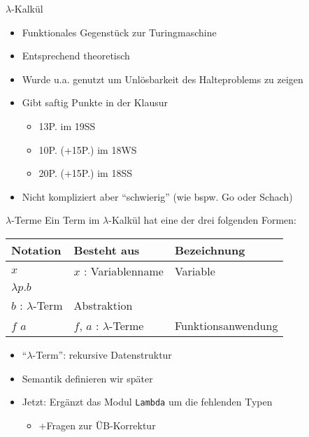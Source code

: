 \documentclass{beamer}
\begin{document}
\begin{frame}{$\lambda$-Kalkül}
	\begin{itemize}
		\item Funktionales Gegenstück zur Turingmaschine
		\item Entsprechend theoretisch
		\item Wurde u.a. genutzt um Unlösbarkeit des Halteproblems zu zeigen
		\item Gibt saftig Punkte in der Klausur
		\begin{itemize}
			\item 13P. im 19SS
			\item 10P. (+15P.) im 18WS
			\item 20P. (+15P.) im 18SS
		\end{itemize}
		\item Nicht kompliziert aber \enquote{schwierig} (wie bspw. Go oder Schach)
	\end{itemize}
\end{frame}

\begin{frame}{$\lambda$-Terme}
	Ein Term im $\lambda$-Kalkül hat eine der drei folgenden Formen:

	\vspace{0.5cm}

	\begin{tabularx}{\textwidth}{ X | X | X }
		\textbf{Notation} & \textbf{Besteht aus}                      & \textbf{Bezeichnung} \\
		\hline
		$x$               & $x$ : Variablenname                       & Variable             \\
		\hline
		$\lambda{}p.b$    &
			\begin{tabular}[t]{@{}c@{}}$p$ : Variablenname\\$b$ : $\lambda$-Term\end{tabular}
									      & Abstraktion          \\
		\hline
		$f$ $a$           & $f$, $a$ : $\lambda$-Terme                & Funktionsanwendung   \\
	\end{tabularx}

	\vspace{0.5cm}

	\begin{itemize}
		\item \enquote{$\lambda$-Term}: rekursive Datenstruktur
		\item Semantik definieren wir später
		\pause
		\item Jetzt: Ergänzt das Modul \texttt{Lambda} um die fehlenden Typen
		\begin{itemize}
			\item +Fragen zur ÜB-Korrektur
		\end{itemize}
	\end{itemize}
\end{frame}
\end{document}
